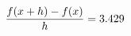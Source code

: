 \documentclass[preview]{standalone}
\begin{document}
\begin{align*}
\special{dvisvgm:raw <g id='unique000'>}\frac{f(x+h)-f(x)}{h} = 3.429\special{dvisvgm:raw </g>}
\end{align*}
\end{document}
